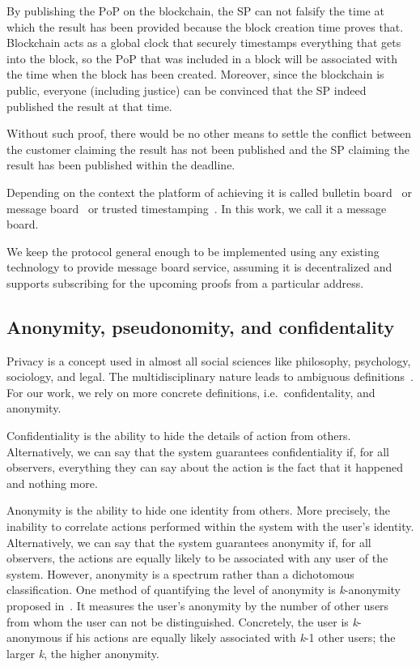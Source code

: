 \documentclass{ieeeaccess}
\begin{document}
By publishing the $\mathrm{PoP}$ on the blockchain, the SP can not falsify the time at which the result has been provided because the block creation time proves that. Blockchain acts as a global clock that securely timestamps everything that gets into the block, so the $\mathrm{PoP}$ that was included in a block will be associated with the time when the block has been created. Moreover, since the blockchain is public, everyone (including justice) can be convinced that the SP indeed published the result at that time.

Without such proof, there would be no other means to settle the conflict between the customer claiming the result has not been published and the SP claiming the result has been published within the deadline.

Depending on the context the platform of achieving it is called bulletin board~\cite{achenbach2015improved} or message board~\cite{hinarejos2019solution} or trusted timestamping~\cite{gipp2015decentralized}. In this work, we call it a message board.

We keep the protocol general enough to be implemented using any existing technology to provide message board service, assuming it is decentralized and supports subscribing for the upcoming proofs from a particular address.

\subsection{Anonymity, pseudonomity, and confidentality}\label{sec:pseudo-anon}

Privacy is a concept used in almost all social sciences like philosophy, psychology, sociology, and legal. The multidisciplinary nature leads to ambiguous definitions~\cite{smith2011information}. For our work, we rely on more concrete definitions, i.e.~confidentality, and anonymity.

Confidentiality is the ability to hide the details of action from others. Alternatively, we can say that the system guarantees confidentiality if, for all observers, everything they can say about the action is the fact that it happened and nothing more.

Anonymity is the ability to hide one identity from others. More precisely, the inability to correlate actions performed within the system with the user's identity. Alternatively, we can say that the system guarantees anonymity if, for all observers, the actions are equally likely to be associated with any user of the system. However, anonymity is a spectrum rather than a dichotomous classification. One method of quantifying the level of anonymity is \textit{k}-anonymity proposed in~\cite{sweeney2002k}. It measures the user's anonymity by the number of other users from whom the user can not be distinguished. Concretely, the user is \textit{k}-anonymous if his actions are equally likely associated with \textit{k}-1 other users; the larger \textit{k}, the higher anonymity.
\end{document}
